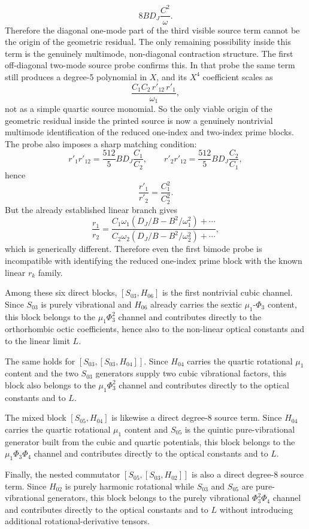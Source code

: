 \documentclass[aip,jcp,reprint,floatfix]{revtex4-2}
\begin{document}
\[
8BD_J\frac{C^2}{\omega}.
\]
Therefore the diagonal one-mode part of the third visible source term cannot
be the origin of the geometric residual. The only remaining possibility inside
this term is the genuinely multimode, non-diagonal contraction structure.
The first off-diagonal two-mode source probe confirms this. In that probe the
same term still produces a degree-5 polynomial in \(X\), and its \(X^4\)
coefficient scales as
\[
\frac{C_1C_2\,r'_{12}\,r'_1}{\omega_1},
\]
not as a simple quartic source monomial. So the only viable origin of the
geometric residual inside the printed source is now a genuinely nontrivial
multimode identification of the reduced one-index and two-index prime blocks.
The probe also imposes a sharp matching condition:
\[
r'_1r'_{12}=\frac{512}{5}BD_J\frac{C_1}{C_2},
\qquad
r'_2r'_{12}=\frac{512}{5}BD_J\frac{C_2}{C_1},
\]
hence
\[
\frac{r'_1}{r'_2}=\frac{C_1^2}{C_2^2}.
\]
But the already established linear branch gives
\[
\frac{r_1}{r_2}
=
\frac{C_1\omega_1\left(D_J/B-B^2/\omega_1^2\right)+\cdots}
{C_2\omega_2\left(D_J/B-B^2/\omega_2^2\right)+\cdots},
\]
which is generically different. Therefore even the first bimode probe is
incompatible with identifying the reduced one-index prime block with the known
linear \(r_k\) family.

Among these six direct blocks, \([S_{03},H_{06}]\) is the first nontrivial
cubic channel. Since \(S_{03}\) is purely vibrational and \(H_{06}\) already
carries the sextic \(\mu_1\)-\(\Phi_3\) content, this block belongs to the
\(\mu_1\Phi_3^2\) channel and contributes directly to the orthorhombic octic
coefficients, hence also to the non-linear optical constants and to the linear
limit \(L\).

The same holds for \([S_{03},[S_{03},H_{04}]]\). Since \(H_{04}\) carries the
quartic rotational \(\mu_1\) content and the two \(S_{03}\) generators supply
two cubic vibrational factors, this block also belongs to the
\(\mu_1\Phi_3^2\) channel and contributes directly to the optical constants and
to \(L\).

The mixed block \([S_{05},H_{04}]\) is likewise a direct degree-8 source term.
Since \(H_{04}\) carries the quartic rotational \(\mu_1\) content and
\(S_{05}\) is the quintic pure-vibrational generator built from the cubic and
quartic potentials, this block belongs to the \(\mu_1\Phi_3\Phi_4\) channel
and contributes directly to the optical constants and to \(L\).

Finally, the nested commutator \([S_{05},[S_{03},H_{02}]]\) is also a direct
degree-8 source term. Since \(H_{02}\) is purely harmonic rotational while
\(S_{03}\) and \(S_{05}\) are pure-vibrational generators, this block belongs
to the purely vibrational \(\Phi_3^2\Phi_4\) channel and contributes directly
to the optical constants and to \(L\) without introducing additional
rotational-derivative tensors.
\end{document}
